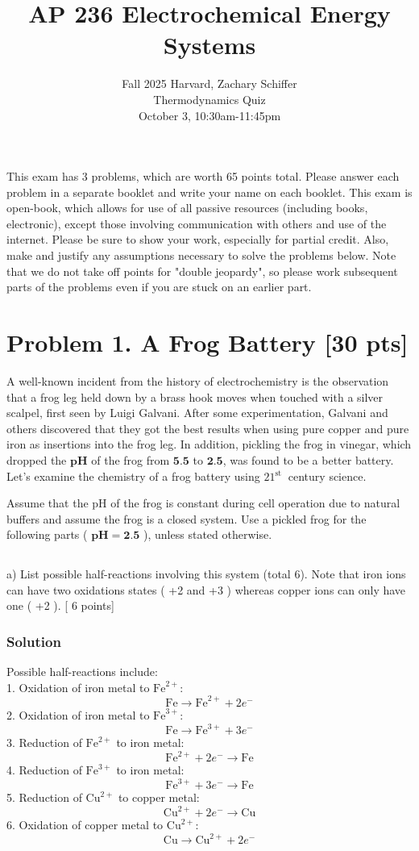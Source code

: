 \documentclass[12pt]{article}
\title{AP 236 Electrochemical Energy Systems }
\author{Fall 2025 Harvard, Zachary Schiffer\\
Thermodynamics Quiz\\
October 3, 10:30am-11:45pm}
\date{}
\begin{document}
\maketitle
\captionsetup{singlelinecheck=false}
This exam has 3 problems, which are worth 65 points total. Please answer each problem in a separate booklet and write your name on each booklet. This exam is open-book, which allows for use of all passive resources (including books, electronic), except those involving communication with others and use of the internet. Please be sure to show your work, especially for partial credit. Also, make and justify any assumptions necessary to solve the problems below. Note that we do not take off points for "double jeopardy", so please work subsequent parts of the problems even if you are stuck on an earlier part.

\section{Problem 1. A Frog Battery [30 pts]}
A well-known incident from the history of electrochemistry is the observation that a frog leg held down by a brass hook moves when touched with a silver scalpel, first seen by Luigi Galvani. After some experimentation, Galvani and others discovered that they got the best results when using pure copper and pure iron as insertions into the frog leg. In addition, pickling the frog in vinegar, which dropped the $\mathbf{p H}$ of the frog from $\mathbf{5 . 5}$ to $\mathbf{2 . 5}$, was found to be a better battery. Let's examine the chemistry of a frog battery using $21{ }^{\text {st }}$ century science.

Assume that the pH of the frog is constant during cell operation due to natural buffers and assume the frog is a closed system. Use a pickled frog for the following parts ( $\mathbf{p H}=\mathbf{2 . 5}$ ), unless stated otherwise.\\[0pt]
\subsection{}
a) List possible half-reactions involving this system (total 6). Note that iron ions can have two oxidations states ( +2 and +3 ) whereas copper ions can only have one ( +2 ). [ 6 points]\\
\subsubsection{Solution}
Possible half-reactions include:\\
1. Oxidation of iron metal to $\mathrm{Fe}^{2+}$:
\[\mathrm{Fe} \rightarrow \mathrm{Fe}^{2+} + 2e^-\]
2. Oxidation of iron metal to $\mathrm{Fe}^{3+}$:
\[\mathrm{Fe} \rightarrow \mathrm{Fe}^{3+} + 3  e^-\]
3. Reduction of $\mathrm{Fe}^{2+}$ to iron metal:
\[\mathrm{Fe}^{2+} + 2e^- \rightarrow \mathrm{Fe}\]
4. Reduction of $\mathrm{Fe}^{3+}$ to iron metal:
\[\mathrm{Fe}^{3+} + 3e^- \rightarrow \mathrm{Fe}\]
5. Reduction of $\mathrm{Cu}^{2+}$ to copper metal:
\[\mathrm{Cu}^{2+} + 2e^- \rightarrow \mathrm{Cu}\]
6. Oxidation of copper metal to $\mathrm{Cu}^{2+}$:
\[\mathrm{Cu} \rightarrow \mathrm{Cu}^{2+} + 2e^-\]
\end{document}
